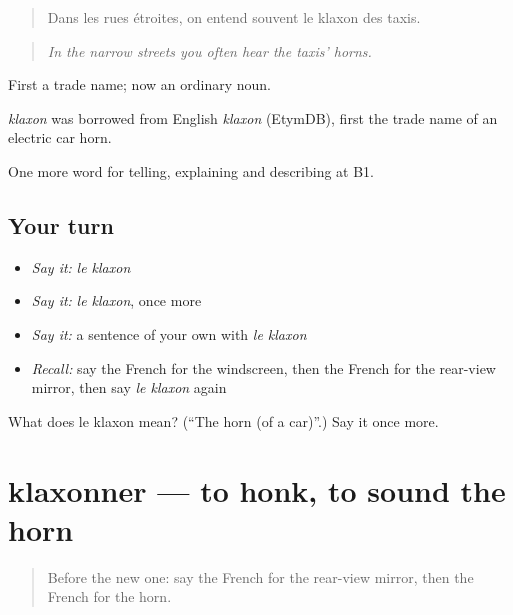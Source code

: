 \begin{quote}
Dans les rues étroites, on entend souvent le klaxon des taxis.
\end{quote}

\begin{quote}
\emph{In the narrow streets you often hear the taxis' horns.}
\end{quote}

First a trade name; now an ordinary noun.

\begin{cousinweb}
\emph{klaxon} was borrowed from English \emph{klaxon} (EtymDB), first the trade name of an electric car horn.
\end{cousinweb}

\begin{grammarlens}[title={What you've built}]
One more word for telling, explaining and describing at B1.
\end{grammarlens}

\subsection*{Your turn}
\begin{itemize}
\raggedright
  \item \emph{Say it:} \emph{le klaxon}
  \item \emph{Say it:} \emph{le klaxon}, once more
  \item \emph{Say it:} a sentence of your own with \emph{le klaxon}
  \item \emph{Recall:} say the French for the windscreen, then the French for the rear-view mirror, then say \emph{le klaxon} again
\end{itemize}

\begin{tcolorbox}[breakable,colback=teal!4,colframe=teal!35!black,title={Before you move on}]
What does le klaxon mean? (\textquotedblleft{}The horn (of a car)\textquotedblright{}.) Say it once more.
\end{tcolorbox}
\section[klaxonner]{klaxonner — to honk, to sound the horn}

\label{lesson:FR-C402-klaxonner}



\begin{quote}
Before the new one: say the French for the rear-view mirror, then the French for the horn.
\end{quote}

